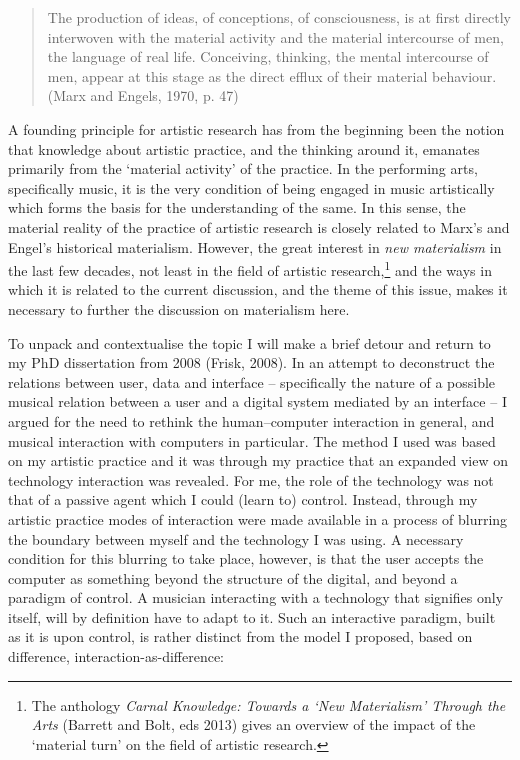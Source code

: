\begin{quote}
The production of ideas, of conceptions, of consciousness, is at first
directly interwoven with the material activity and the material
intercourse of men, the language of real life. Conceiving, thinking, the
mental intercourse of men, appear at this stage as the direct efflux of
their material behaviour. (Marx and Engels, 1970, p. 47)
\end{quote}

A founding principle for artistic research has from the beginning been
the notion that knowledge about artistic practice, and the thinking
around it, emanates primarily from the `material activity' of the
practice. In the performing arts, specifically music, it is the very
condition of being engaged in music artistically which forms the basis
for the understanding of the same. In this sense, the material reality
of the practice of artistic research is closely related to Marx's and
Engel's historical materialism. However, the great interest in \emph{new
materialism} in the last few decades, not least in the field of artistic
research,\footnote{The anthology \emph{Carnal Knowledge: Towards a `New
  Materialism' Through the Arts} (Barrett and Bolt, eds 2013) gives an
  overview of the impact of the `material turn' on the field of artistic
  research.} and the ways in which it is related to the current
discussion, and the theme of this issue, makes it necessary to further
the discussion on materialism here.

To unpack and contextualise the topic I will make a brief detour and
return to my PhD dissertation from 2008 (Frisk, 2008). In an attempt to
deconstruct the relations between user, data and interface --
specifically the nature of a possible musical relation between a user
and a digital system mediated by an interface -- I argued for the need
to rethink the human--computer interaction in general, and musical
interaction with computers in particular. The method I used was based on
my artistic practice and it was through my practice that an expanded
view on technology interaction was revealed. For me, the role of the
technology was not that of a passive agent which I could (learn to)
control. Instead, through my artistic practice modes of interaction were
made available in a process of blurring the boundary between myself and
the technology I was using. A necessary condition for this blurring to
take place, however, is that the user accepts the computer as something
beyond the structure of the digital, and beyond a paradigm of control. A
musician interacting with a technology that signifies only itself, will
by definition have to adapt to it. Such an interactive paradigm, built
as it is upon control, is rather distinct from the model I proposed,
based on difference, interaction-as-difference:


